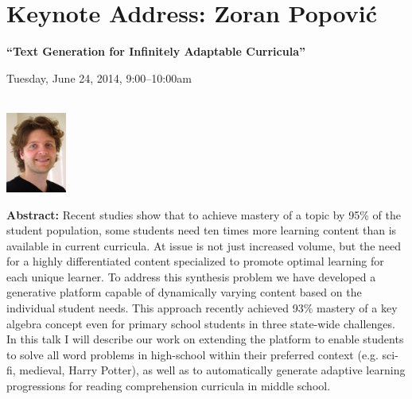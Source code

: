 \section{Keynote Address: Zoran Popović}
\begin{center}

\begin{Large}
{\bfseries\Large ``Text Generation for Infinitely Adaptable Curricula''}
\vspace{1em}\par
\end{Large}

Tuesday, June 24, 2014, 9:00--10:00am \vspace{1em}\\
\PlenaryLoc \\
\vspace{1em}\par
\includegraphics[height=100px]{content/tuesday/popovic-headshot.jpg}
\end{center}

\noindent
{\bfseries Abstract:} Recent studies show that to achieve mastery of a
topic by 95\% of the student population, some students need ten times
more learning content than is available in current curricula.  At
issue is not just increased volume, but the need for a highly
differentiated content specialized to promote optimal learning for
each unique learner.  To address this synthesis problem we have
developed a generative platform capable of dynamically varying content
based on the individual student needs.  This approach recently
achieved 93\% mastery of a key algebra concept even for primary school
students in three state-wide challenges.  In this talk I will describe
our work on extending the platform to enable students to solve all
word problems in high-school within their preferred context
(e.g. sci-fi, medieval, Harry Potter), as well as to automatically
generate adaptive learning progressions for reading comprehension
curricula in middle school.

\vspace{3em}\par 

\vfill
\noindent

